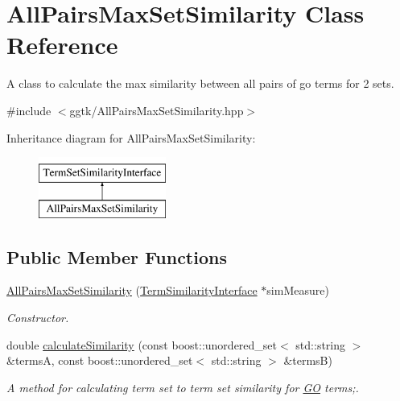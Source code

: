 \hypertarget{classAllPairsMaxSetSimilarity}{}\section{All\+Pairs\+Max\+Set\+Similarity Class Reference}
\label{classAllPairsMaxSetSimilarity}


A class to calculate the max similarity between all pairs of go terms for 2 sets.  




{\ttfamily \#include $<$ggtk/\+All\+Pairs\+Max\+Set\+Similarity.\+hpp$>$}

Inheritance diagram for All\+Pairs\+Max\+Set\+Similarity\+:\begin{figure}[H]
\begin{center}
\leavevmode
\includegraphics[height=2.000000cm]{classAllPairsMaxSetSimilarity}
\end{center}
\end{figure}
\subsection*{Public Member Functions}
\begin{DoxyCompactItemize}
\item 
\hyperlink{classAllPairsMaxSetSimilarity_a5aef6b55e2aa3b94b62278eb5464dd68}{All\+Pairs\+Max\+Set\+Similarity} (\hyperlink{classTermSimilarityInterface}{Term\+Similarity\+Interface} $\ast$sim\+Measure)
\begin{DoxyCompactList}\small\item\em Constructor. \end{DoxyCompactList}\item 
double \hyperlink{classAllPairsMaxSetSimilarity_a0eed3f63e2acdeb8365900b9d7a038c1}{calculate\+Similarity} (const boost\+::unordered\+\_\+set$<$ std\+::string $>$ \&termsA, const boost\+::unordered\+\_\+set$<$ std\+::string $>$ \&termsB)
\begin{DoxyCompactList}\small\item\em A method for calculating term set to term set similarity for \hyperlink{namespaceGO}{GO} terms;. \end{DoxyCompactList}\end{DoxyCompactItemize}


